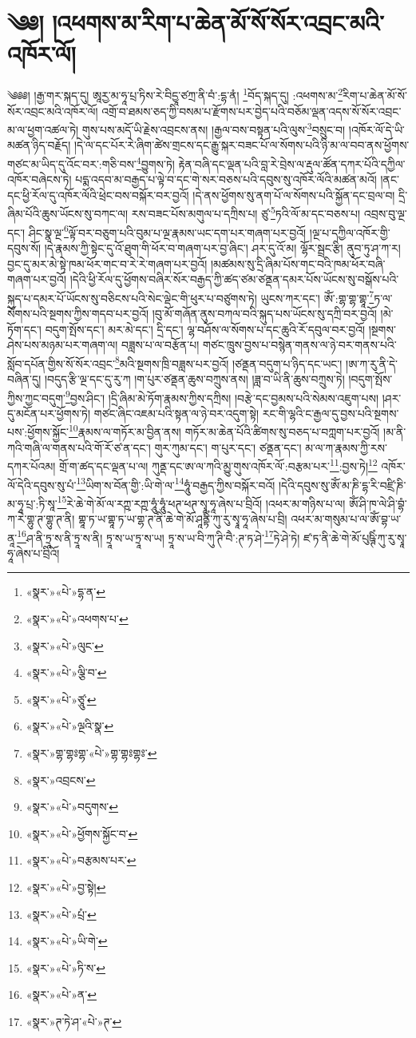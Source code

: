 \chapter{༄༅། །འཕགས་མ་རིག་པ་ཆེན་མོ་སོ་སོར་འབྲང་མའི་འཁོར་ལོ།}༄༅༅། །རྒྱ་གར་སྐད་དུ། ཨཱརྱ་མ་ཧཱ་པྲ་ཏིས་རེ་བིདྱཱ་ཙཀྲ་ནི་བཾ་:དྷ་ནཾ། \footnote{«སྣར་»«པེ་»དྷ་ན་}བོད་སྐད་དུ། :འཕགས་མ་\footnote{«སྣར་»«པེ་»འཕགས་པ་}རིག་པ་ཆེན་མོ་སོ་སོར་འབྲང་མའི་འཁོར་ལོ། འགྲོ་བ་ཐམས་ཅད་ཀྱི་བསམ་པ་རྫོགས་པར་བྱེད་པའི་བཅོམ་ལྡན་འདས་སོ་སོར་འབྲང་མ་ལ་ཕྱག་འཚལ་ཏེ། གུས་པས་མདོ་ཡི་རྗེས་འབྲངས་ནས། །རྒྱལ་བས་བསྟན་པའི་ལུས་\footnote{«སྣར་»«པེ་»ལུང་}བསྲུང་བ། །འཁོར་ལོ་དེ་ཡི་མཚན་ཉིད་བརྗོད། །དེ་ལ་དང་པོར་རེ་ཞིག་ཚེས་གྲངས་དང་རྒྱུ་སྐར་བཟང་པོ་ལ་སོགས་པའི་ཉི་མ་ལ་བབ་ནས་ཕྱོགས་གཙང་མ་ཡིད་དུ་འོང་བར་:གཅི་བས་\footnote{«སྣར་»«པེ་»ལྕི་བ་}བྱུགས་ཏེ། རྟེན་བཞི་དང་ལྡན་པའི་བླ་རེ་བྲེས་ལ་རྡུལ་ཚོན་དཀར་པོའི་དཀྱིལ་འཁོར་བཞེངས་ཏེ། པདྨ་འདབ་མ་བརྒྱད་པ་ལྟེ་བ་དང་གེ་སར་བཅས་པའི་དབུས་སུ་འཁོར་ལོའི་མཚན་མའོ། །ནང་དང་ཕྱི་རོལ་དུ་འཁོར་ལོའི་ཕྲེང་བས་བསྐོར་བར་བྱའོ། །དེ་ནས་ཕྱོགས་སུ་ནག་པོ་ལ་སོགས་པའི་སྐྱོན་དང་བྲལ་བ། དྲི་ཞིམ་པོའི་ཆུས་ཡོངས་སུ་བཀང་ལ། རས་བཟང་པོས་མགུལ་པ་དཀྲིས་པ། ཙུ་\footnote{«སྣར་»«པེ་»ཙཱུ་}ཏའི་ལོ་མ་དང་བཅས་པ། འབྲས་བུ་ལྔ་དང་། ཤིང་སྣ་ལྔ་\footnote{«སྣར་»«པེ་»ལྔའི་སྣ་}ལྟོ་བར་བཅུག་པའི་བུམ་པ་ལྔ་རྣམས་ཡང་དག་པར་གཞག་པར་བྱའོ། །ལྔ་པ་དཀྱིལ་འཁོར་གྱི་དབུས་སོ། །དེ་རྣམས་ཀྱི་སྟེང་དུ་འོ་ཐུག་གི་ཕོར་བ་གཞག་པར་བྱ་ཞིང་། ཤར་དུ་འོ་མ། ལྷོར་སྦྲང་རྩི། ནུབ་ཏུ་ཤ་ཀ་ར། བྱང་དུ་མར་མེ་སྟེ་ཁམ་ཕོར་གང་བ་རེ་རེ་གཞག་པར་བྱའོ། །མཚམས་སུ་དྲི་ཞིམ་པོས་གང་བའི་ཁམ་ཕོར་བཞི་གཞག་པར་བྱའོ། །དེའི་ཕྱི་རོལ་དུ་ཕྱོགས་བཞིར་སོར་བརྒྱད་ཀྱི་ཚད་ཙམ་ཙནྡན་དམར་པོས་ཡོངས་སུ་བསྒོས་པའི་སྐུད་པ་དམར་པོ་ཡོངས་སུ་བཅིངས་པའི་སེང་ལྡེང་གི་ཕུར་པ་བཙུགས་ཏེ། ཡུངས་ཀར་དང་། ཨོཾ་:གྷ་གྷ་གྷཱ་\footnote{«སྣར་»གྷ་གྷཿགྷ་«པེ་»གྷ་གྷཿགྷཿ་}ཏ་ལ་སོགས་པའི་སྔགས་ཀྱིས་གདབ་པར་བྱའོ། །བུ་མོ་གཞོན་ནུས་བཀལ་བའི་སྐུད་པས་ཡོངས་སུ་དཀྲི་བར་བྱའོ། །མེ་ཏོག་དང་། བདུག་སྤོས་དང་། མར་མེ་དང་། དྲི་དང་། ལྷ་བཤོས་ལ་སོགས་པ་དང་ཆུའི་རོ་དབུལ་བར་བྱའོ། །སྔགས་ཤེས་པས་མཉམ་པར་གཞག་ལ། བཟླས་པ་ལ་བརྩོན་པ། གཙང་ཁྲུས་བྱས་པ་བསྙེན་གནས་ལ་ཉེ་བར་གནས་པའི་སློབ་དཔོན་གྱིས་སོ་སོར་འབྲང་\footnote{«སྣར་»འབྲངས་}མའི་སྔགས་ཁྲི་བཟླས་པར་བྱའོ། །ཙནྡན་བདུག་པ་ཉིད་དང་ཡང་། །ཨ་ཀ་རུ་ནི་དེ་བཞིན་དུ། །བདུད་རྩི་ལྔ་དང་དུ་རུ་ཀ །ག་པུར་ཙནྡན་ཆུས་བཀྲུས་ནས། །ཟླ་བ་ཡི་ནི་ཆུས་བཀྲུས་ཏེ། །བདུག་སྤོས་ཀྱིས་ཀྱང་བདུག་\footnote{«སྣར་»«པེ་»བདུགས་}བྱས་ཤིང་། །དྲི་ཞིམ་མེ་ཏོག་རྣམས་ཀྱིས་དཀྲིས། །བརྩེ་དང་བྱམས་པའི་སེམས་འཇུག་པས། །ཤར་དུ་མངོན་པར་ཕྱོགས་ཏེ། གཙང་ཞིང་འཇམ་པའི་སྟན་ལ་ཉེ་བར་འདུག་སྟེ། རང་གི་ལྷའི་ང་རྒྱལ་དུ་བྱས་པའི་སྔགས་པས་:ཕྱོགས་སྐྱོང་\footnote{«སྣར་»«པེ་»ཕྱོགས་སྐྱོང་བ་}རྣམས་ལ་གཏོར་མ་བྱིན་ནས། གཏོར་མ་ཆེན་པོའི་ཚིགས་སུ་བཅད་པ་བཀླག་པར་བྱའོ། །མ་ནི་ཀའི་གཞི་ལ་གནས་པའི་གོ་རོ་ཙ་ན་དང་། གུར་ཀུམ་དང་། ག་པུར་དང་། ཙནྡན་དང་། མ་ལ་ཀ་རྣམས་ཀྱི་རས་དཀར་པོའམ། གྲོ་ག་ཚད་དང་ལྡན་པ་ལ། ཀུནྡ་དང་ཨ་ལ་ཀའི་མྱུ་གུས་འཁོར་ལོ་:བརྩམ་པར་\footnote{«སྣར་»«པེ་»བརྩམས་པར་}:བྱས་ཏེ།\footnote{«སྣར་»«པེ་»བྱ་སྟེ།} འཁོར་ལོ་དེའི་དབུས་སུ་པཾ་\footnote{«སྣར་»«པེ་»པྲཾ་}ཡིག་ས་བོན་གྱི་:ཡི་གེ་ལ་\footnote{«སྣར་»«པེ་»ཡི་གེ་}ཧཱུཾ་བརྒྱད་ཀྱིས་བསྐོར་བའོ། །དེའི་དབུས་སུ་ཨོཾ་མ་ཎི་དྷ་རི་བཛྲི་ཎི་མ་ཧཱ་པྲ་:ཏི་སཱ་\footnote{«སྣར་»«པེ་»ཏི་ས་}རེ་ཆེ་གེ་མོ་ལ་རཀྵ་རཀྵ་ཧཱུཾ་ཧཱུཾ་ཕཊ་ཕཊ་སྭཱ་ཧཱ་ཞེས་པ་བྲིའོ། །འཕར་མ་གཉིས་པ་ལ། ཨོཾ་ཤི་ཁ་ལེ་ཤི་བྷཾ་ཀ་རེ་གྷུ་ཊ་གྷུ་ཊ་ནི། གྷཱ་ཏ་ཡ་གྷཱ་ཏ་ཡ་གྷ་ཊ་ནི་ཆེ་གེ་མོ་ཤཱནྟིཾ་ཀུ་རུ་སྭཱ་ཧཱ་ཞེས་པ་བྲི། འཕར་མ་གསུམ་པ་ལ་ཨོཾ་བྷ་ཡ་ནཱ་\footnote{«སྣར་»«པེ་»ན་}ཤ་ནི་ཏྲཱ་ས་ནི་ཏྲཱ་ས་ནི། ཏྲཱ་ས་ཡ་ཏྲཱ་ས་ཡ། ཏྲཱ་ས་ཡ་བི་ཀུ་ཊི་བཻ་:ཊ་ཏ་ཤེ་\footnote{«སྣར་»ཊ་ཏེ་ཤ་«པེ་»ཊ་}ཏེ་ཤེ་ཏེ། ཛ་ཏ་ནི་ཆེ་གེ་མོ་པུཥྚིཾ་ཀུ་རུ་སྭཱ་ཧཱ་ཞེས་པ་བྲིའོ། 